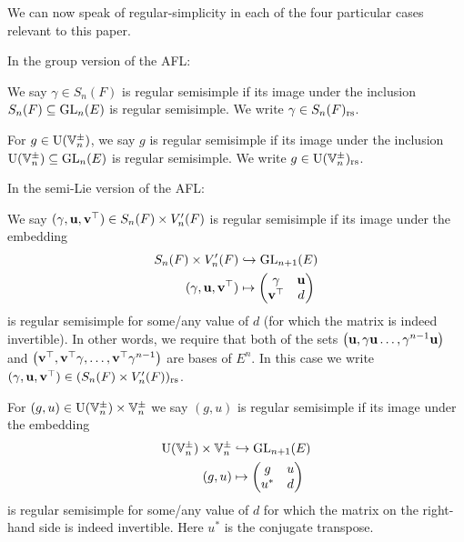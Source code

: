 We can now speak of regular-simplicity in each of the four
particular cases relevant to this paper.
\begin{definition}
  In the group version of the AFL:
  \begin{itemize}
    \ii We say $\gamma \in S_n(F)$ is regular semisimple
    if its image under the inclusion $S_n(F) \subseteq \operatorname{GL}_n(E)$ is regular semisimple.
    We write $\gamma \in S_n(F)_{\mathrm{rs}}$.

    \ii For $g \in \operatorname{U}(\mathbb V_n^\pm)$,
    we say $g$ is regular semisimple
    if its image under the inclusion $\operatorname{U}(\mathbb V_n^\pm) \subseteq \operatorname{GL}_n(E)$ is regular semisimple.
    We write $g \in \operatorname{U}(\mathbb V_n^\pm)_{\mathrm{rs}}$.
  \end{itemize}
  In the semi-Lie version of the AFL:
  \begin{itemize}
    \ii We say $(\gamma, \mathbf u, \mathbf v^\top) \in S_n(F) \times V'_n(F)$
    is regular semisimple if its image under the embedding
    \begin{equation}
      \begin{aligned}
        S_n(F) \times V'_n(F) &\hookrightarrow \operatorname{GL}_{n+1}(E) \\
        (\gamma, \mathbf u, \mathbf v^\top) &\mapsto \begin{pmatrix} \gamma & \mathbf u \\ \mathbf v^\top & d \end{pmatrix}
      \end{aligned}
      \label{eq:embed_FJ_analytic}
    \end{equation}
    is regular semisimple for some/any value of $d$
    (for which the matrix is indeed invertible).
    In other words, we require that
    both of the sets
    $\left( \mathbf u, \gamma \mathbf u \dots, \gamma^{n-1}\mathbf u \right)$
    and
    $\left( \mathbf v^\top, \mathbf v^\top \gamma, \dots, \mathbf v^\top \gamma^{n-1} \right)$
    are bases of $E^n$.
    In this case we write $(\gamma, \mathbf u, \mathbf v^\top) \in (S_n(F) \times V'_n(F))_{\mathrm{rs}}$.

    \ii For $(g,u) \in \operatorname{U}(\mathbb V_n^\pm) \times \mathbb V_n^\pm$ we say $(g, u)$
    is regular semisimple if its image under the embedding
    \begin{equation}
      \begin{aligned}
        \operatorname{U}(\mathbb V_n^\pm) \times \mathbb V_n^\pm &\hookrightarrow \operatorname{GL}_{n+1}(E) \\
        (g, u) &\mapsto \begin{pmatrix} g & u \\ u^\ast & d \end{pmatrix}
      \end{aligned}
      \label{eq:embed_FJ_geometric}
    \end{equation}
    is regular semisimple for some/any value of $d$
    for which the matrix on the right-hand side is indeed invertible.
    Here $u^\ast$ is the conjugate transpose.


\end{itemize}
\end{definition}
